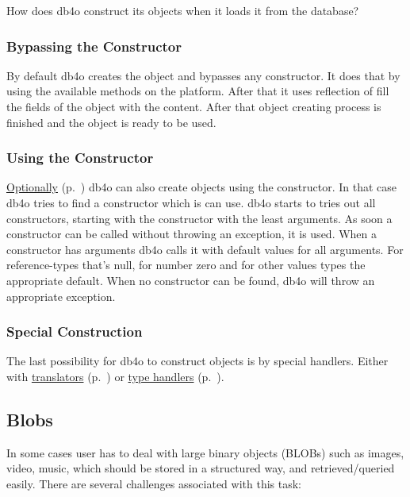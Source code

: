 How does db4o construct its objects when it loads it from the database?

\subsubsection*{Bypassing the Constructor}

By default db4o creates the object and bypasses any constructor. It does that by using the available methods on the platform. After that it uses reflection of fill the fields of the object with the content. After that object creating process is finished and the object is ready to be used.

\subsubsection*{Using the Constructor}

\hyperref[ref:configuration-common-calling-constructors]{Optionally} (p.~\pageref{ref:configuration-common-calling-constructors}) db4o can also create objects using the constructor. In that case db4o tries to find a constructor which is can use. db4o starts to tries out all constructors, starting with the constructor with the least arguments. As soon a constructor can be called without throwing an exception, it is used. When a constructor has arguments db4o calls it with default values for all arguments. For reference-types that's null, for number zero and for other values types the appropriate default. When no constructor can be found, db4o will throw an appropriate exception.

\subsubsection*{Special Construction}

The last possibility for db4o to construct objects is by special handlers. Either with \hyperref[ref:advanced-topics-type-handling-translators]{translators} (p.~\pageref{ref:advanced-topics-type-handling-translators}) or \hyperref[ref:advanced-topics-type-handling-typehandlers]{type handlers} (p.~\pageref{ref:advanced-topics-type-handling-typehandlers}).

\subsection{Blobs}
\label{ref:advanced-topics-type-handling-blobs}

In some cases user has to deal with large binary objects (BLOBs) such as images, video, music, which should be stored in a structured way, and retrieved/queried easily. There are several challenges associated with this task:


